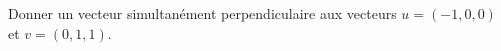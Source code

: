 
\begin{exercice}\label{exoOutilsMath-0045}

    Donner un vecteur simultanément perpendiculaire aux vecteurs $u=(-1,0,0)$ et $v=(0,1,1)$.

\end{exercice}
